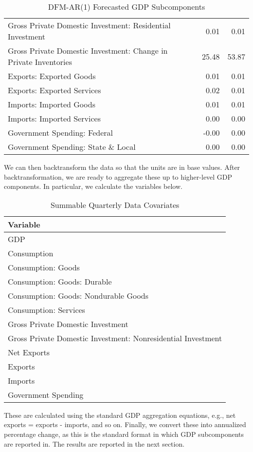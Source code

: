 \documentclass[11pt, letterpaper]{article}\usepackage[]{graphicx}\usepackage[]{color}
\begin{document}
\begin{table}[H]
\begin{tabular}{lrr}
  Gross Private Domestic Investment: Residential Investment & 0.01 & 0.01 \\ 
  Gross Private Domestic Investment: Change in Private Inventories & 25.48 & 53.87 \\ 
  Exports: Exported Goods & 0.01 & 0.01 \\ 
  Exports: Exported Services & 0.02 & 0.01 \\ 
  Imports: Imported Goods & 0.01 & 0.01 \\ 
  Imports: Imported Services & 0.00 & 0.00 \\ 
  Government Spending: Federal & -0.00 & 0.00 \\ 
  Government Spending: State \& Local & 0.00 & 0.00 \\ 
   \hline
\end{tabular}
\endgroup
\caption{DFM-AR(1) Forecasted GDP Subcomponents} 
\end{table}


We can then backtransform the data so that the units are in base values. After backtransformation, we are ready to aggregate these up to higher-level GDP components. In particular, we calculate the variables below.
\begin{table}[H]
\centering
\begingroup\scriptsize
\begin{tabular}{l}
  \hline
Variable \\ 
  \hline
GDP \\ 
  Consumption \\ 
  Consumption: Goods \\ 
  Consumption: Goods: Durable \\ 
  Consumption: Goods: Nondurable Goods \\ 
  Consumption: Services \\ 
  Gross Private Domestic Investment \\ 
  Gross Private Domestic Investment: Nonresidential Investment \\ 
  Net Exports \\ 
  Exports \\ 
  Imports \\ 
  Government Spending \\ 
   \hline
\end{tabular}
\endgroup
\caption{Summable Quarterly Data Covariates} 
\end{table}

These are calculated using the standard GDP aggregation equations, e.g., net exports = exports - imports, and so on.
Finally, we convert these into annualized percentage change, as this is the standard format in which GDP subcomponents are reported in. The results are reported in the next section.
\end{document}
